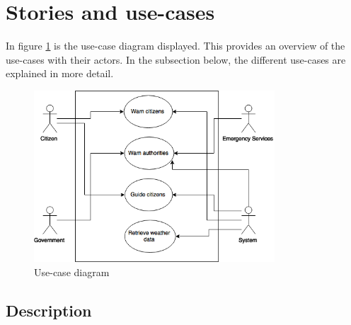 \section{Stories and use-cases}
In figure \ref{fig:usecase-diagram} is the use-case diagram displayed. This provides an overview of the use-cases with their actors. In the subsection below, the different use-cases are explained in more detail.

\begin{figure}[h]
\centering
\includegraphics[width=90mm]{images/usecaseDiagram.png}
\caption{Use-case diagram}
\label{fig:usecase-diagram}
\end{figure}

\subsection{Description}

